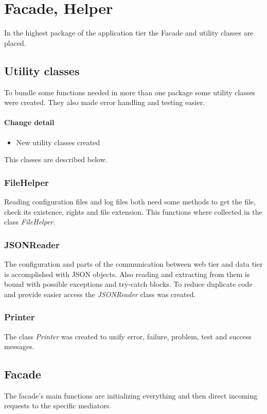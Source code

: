\section{Facade, Helper}
In the highest package of the application tier the
Facade and utility classes are placed.

\subsection{Utility classes}\label{utility}
To bundle some functions needed in more than one package some utility
classes were created. They also made error handling and 
testing easier. 

\paragraph{Change detail}
\begin{itemize}
  \item New utility classes created
\end{itemize}

This classes are described below.

\subsubsection{FileHelper}
Reading configuration files and log files both need some methods to get the file,
check its existence, rights and file extension. This functions
where collected in the class \textit{FileHelper}.

\subsubsection{JSONReader}\label{reader}
The configuration and parts of the communication between web tier
and data tier is accomplished with JSON objects. Also reading and
extracting from them is bound with possible exceptions and try-catch blocks.
To reduce duplicate code and provide easier access the \textit{JSONReader} class
was created.

\subsubsection{Printer}
The class \textit{Printer} was created to unify error, failure, problem, test
and success messages.


\subsection{Facade}
The facade's main functions are initializing everything and then direct incoming requests to
the specific mediators. 

